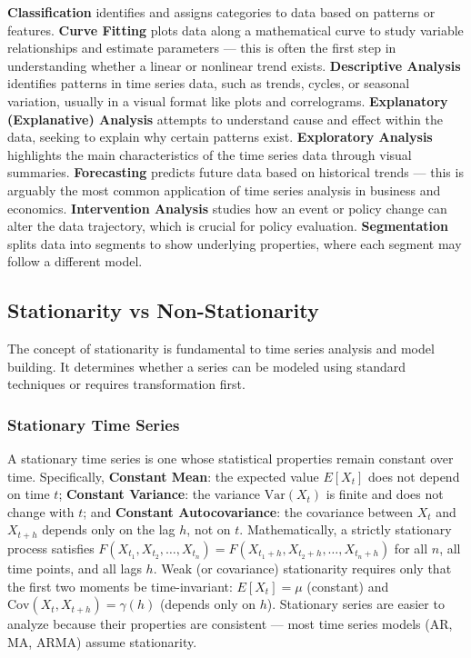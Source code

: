 \documentclass[11pt,a4paper]{article}
\begin{document}
\textbf{Classification} identifies and assigns categories to data based on patterns or features. \textbf{Curve Fitting} plots data along a mathematical curve to study variable relationships and estimate parameters --- this is often the first step in understanding whether a linear or nonlinear trend exists. \textbf{Descriptive Analysis} identifies patterns in time series data, such as trends, cycles, or seasonal variation, usually in a visual format like plots and correlograms. \textbf{Explanatory (Explanative) Analysis} attempts to understand cause and effect within the data, seeking to explain why certain patterns exist. \textbf{Exploratory Analysis} highlights the main characteristics of the time series data through visual summaries. \textbf{Forecasting} predicts future data based on historical trends --- this is arguably the most common application of time series analysis in business and economics. \textbf{Intervention Analysis} studies how an event or policy change can alter the data trajectory, which is crucial for policy evaluation. \textbf{Segmentation} splits data into segments to show underlying properties, where each segment may follow a different model.

\subsection{Stationarity vs Non-Stationarity}

The concept of stationarity is fundamental to time series analysis and model building. It determines whether a series can be modeled using standard techniques or requires transformation first.

\subsubsection{Stationary Time Series}

A stationary time series is one whose statistical properties remain constant over time. Specifically, \textbf{Constant Mean}: the expected value $E[X_t]$ does not depend on time $t$; \textbf{Constant Variance}: the variance $\text{Var}(X_t)$ is finite and does not change with $t$; and \textbf{Constant Autocovariance}: the covariance between $X_t$ and $X_{t+h}$ depends only on the lag $h$, not on $t$. Mathematically, a strictly stationary process satisfies $F(X_{t_1}, X_{t_2}, \ldots, X_{t_n}) = F(X_{t_1+h}, X_{t_2+h}, \ldots, X_{t_n+h})$ for all $n$, all time points, and all lags $h$. Weak (or covariance) stationarity requires only that the first two moments be time-invariant: $E[X_t] = \mu$ (constant) and $\text{Cov}(X_t, X_{t+h}) = \gamma(h)$ (depends only on $h$). Stationary series are easier to analyze because their properties are consistent --- most time series models (AR, MA, ARMA) assume stationarity.
\end{document}
